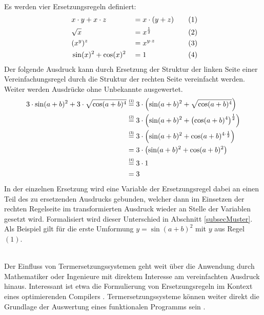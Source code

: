 \begin{beispiel}~\\
Es werden vier Ersetzungsregeln definiert:
\begin{alignat*}{4}
    ~& x \cdot y + x \cdot z & &= x \cdot (y + z) &~~~& (1) \\
    ~& \sqrt{x}              & &= x^{\frac 1 2}   &~~~& (2) \\
    ~& (x^y)^z         & &= x^{y \cdot z}   &~~~& (3) \\
    ~& \sin(x)^2 + \cos(x)^2 & &= 1               &~~~& (4)
\end{alignat*}
Der folgende Ausdruck kann durch Ersetzung der Struktur der linken Seite einer Vereinfachungsregel durch die Struktur der rechten Seite vereinfacht werden. Weiter werden Ausdrücke ohne Unbekannte ausgewertet.
\begin{equation*}
    \begin{split}
	3 \cdot \sin(a + b)^2 + 3 \cdot \sqrt{\cos(a + b)^4}
	&\stapel = {(1)} 3 \cdot \paren*{\sin(a + b)^2 + \sqrt{\cos(a + b)^4}} \\
	&\stapel = {(2)} 3 \cdot \paren*{\sin(a + b)^2 + \paren*{{\cos(a + b)^4}}^{\frac 1 2}}\\
	&\stapel = {(3)} 3 \cdot \paren*{\sin(a + b)^2 + {\cos(a + b)^{4 \cdot \frac 1 2}}}\\
	& =              3 \cdot \paren*{\sin(a + b)^2 + {\cos(a + b)^2}}\\
	&\stapel = {(4)} 3 \cdot 1\\
    & = 3
    \end{split}
\end{equation*}
In der einzelnen Ersetzung wird eine Variable der Ersetzungsregel dabei an einen Teil des zu ersetzenden Ausdrucks gebunden, welcher dann im Einsetzen der rechten Regelseite im transformierten Ausdruck wieder an Stelle der Variablen gesetzt wird.
 Formalisiert wird dieser Unterschied in Abschnitt \ref{subsecMuster}. Als Beispiel gilt für die erste Umformung $y = \sin(a + b)^2$ mit $y$ aus Regel $(1)$.
\end{beispiel}

~\\
Der Einfluss von Termersetzungssystemen geht weit über die Anwendung durch Mathematiker oder Ingenieure mit direktem Interesse am vereinfachten Ausdruck hinaus. Interessant ist etwa die Formulierung von Ersetzungsregeln im Kontext eines optimierenden Compilers \cite{HaskellCustomRewriteRules, HaskellCoreOptimizer}. Termersetzungssysteme können weiter direkt die Grundlage der Auswertung eines funktionalen Programms sein \cite{Jones1987JanRewritingMiranda}.


